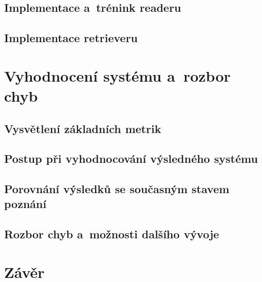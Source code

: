 \section{Implementace a~trénink readeru}
\label{reader_imp}




\section{Implementace retrieveru}
\label{retriever_imp}






\chapter{Vyhodnocení systému a~rozbor chyb}
\label{system_evaluation}



\section{Vysvětlení základních metrik}
\label{metriky}

\section{Postup při vyhodnocování výsledného systému}


\section{Porovnání výsledků se současným stavem poznání}


\section{Rozbor chyb a~možnosti dalšího vývoje}




\chapter{Závěr}
\label{conclusion}



